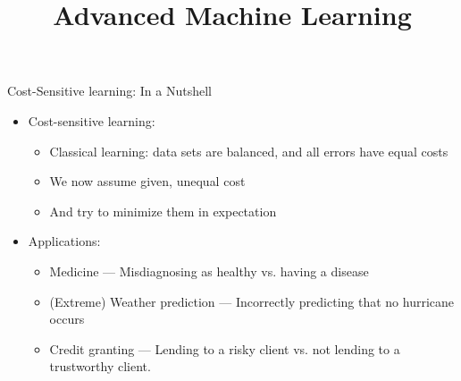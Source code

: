\documentclass[11pt,compress,t,notes=noshow, xcolor=table]{beamer}
\title{Advanced Machine Learning}
\date{}
\begin{document}



\sloppy


\begin{vbframe}{Cost-Sensitive learning: In a Nutshell}
	\scriptsize{

		\begin{itemize}
		
    		\item Cost-sensitive learning: 
                \begin{itemize}
                    \scriptsize
                    \item Classical learning: data sets are balanced, and all errors have equal costs
                    \item We now assume given, unequal cost
                    \item And try to minimize them in expectation

                \end{itemize}
    		
    		\item Applications:
      
    		\begin{itemize}
    			\scriptsize	
    			\item Medicine --- Misdiagnosing as healthy vs. having a disease
    			\item (Extreme) Weather prediction ---  Incorrectly predicting that no hurricane occurs 
    			\item Credit granting --- Lending to a risky client vs. not lending to a trustworthy client.
    		\end{itemize}
         
		
		\end{itemize}
        \vspace{15pt}

}
\end{vbframe}
\end{document}

